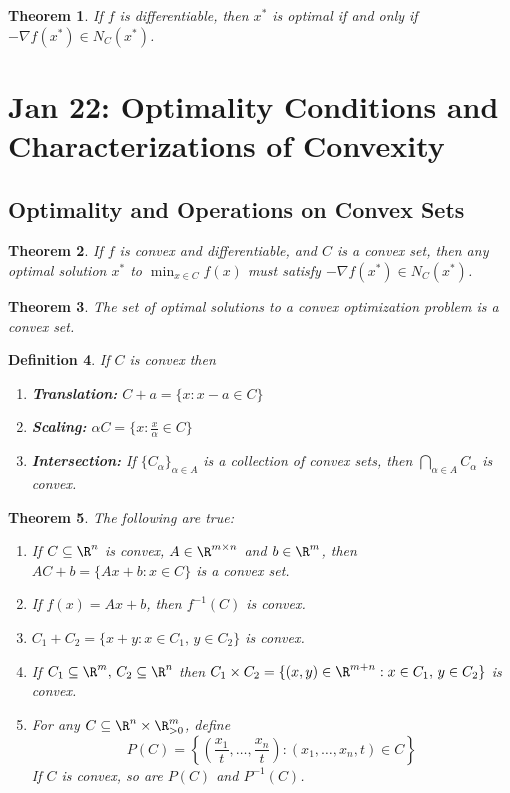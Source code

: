 \documentclass[a4paper]{article}
\newtheorem{thm}{Theorem}[section]
\newtheorem{defn}[thm]{Definition}
\begin{document}
\begin{thm}
    If $f$ is differentiable, then $x^*$ is optimal if and only if $-\nabla f(x^*) \in N_C(x^*)$.
\end{thm}

\newpage
\section{Jan 22: Optimality Conditions and Characterizations of Convexity}

\subsection{Optimality and Operations on Convex Sets}
\begin{thm}
    If $f$ is convex and differentiable, and $C$ is a convex set, then any optimal solution $x^*$ to $\min_{x \in C} f(x)$ must satisfy $-\nabla f(x^*) \in N_C(x^*)$.
\end{thm}

\begin{thm}
    The set of optimal solutions to a convex optimization problem is a convex set.
\end{thm}

\begin{defn}
    If $C$ is convex then
    \begin{enumerate}
        \item \textbf{Translation:} $C+a = \{ x : x-a \in C \}$
        \item \textbf{Scaling:} $\alpha C = \{ x : \frac{x}{\alpha} \in C \}$
        \item \textbf{Intersection:} If $\{C_\alpha\}_{\alpha \in A}$ is a collection of convex sets, then $\bigcap_{\alpha \in A} C_\alpha$ is convex.
    \end{enumerate}
\end{defn}

\begin{thm}
    The following are true:
    \begin{enumerate}
        \item If $C \subseteq \R^n$ is convex, $A \in \R^{m \times n}$ and $b \in \R^m$, then $AC + b = \{ Ax + b : x \in C \}$ is a convex set.
        \item If $f(x) = Ax + b$, then $f^{-1}(C)$ is convex.
        \item $C_1 + C_2 = \{ x + y : x \in C_1,\, y \in C_2 \}$ is convex.
        \item If $C_1 \subseteq \R^m,\, C_2 \subseteq \R^n$ then $C_1 \times C_2 = \{ (x, y) \in \R^{m+n} : x \in C_1,\, y \in C_2 \}$ is convex.
        \item For any $C \subseteq \R^n \times \R_{>0}^m$, define
        \[
            P(C) = \left\{ \left( \frac{x_1}{t}, \ldots, \frac{x_n}{t} \right) : (x_1, \ldots, x_n, t) \in C \right\}
        \]
        If $C$ is convex, so are $P(C)$ and $P^{-1}(C)$.
    \end{enumerate}
\end{thm}
\end{document}
